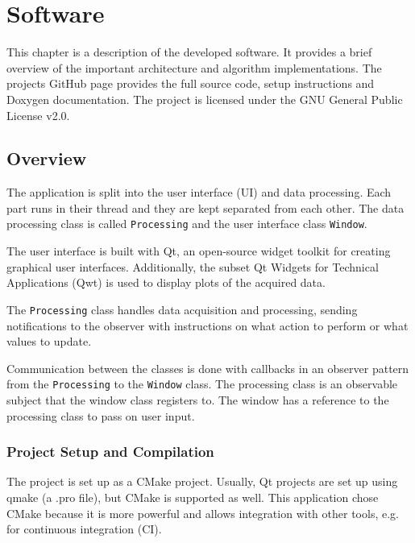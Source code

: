 \chapter{Software}\label{cp:sw}

This chapter is a description of the developed software. It provides a brief overview of the important architecture and algorithm implementations. The projects GitHub page provides the full source code, setup instructions and Doxygen documentation.\cite{Belinda2020} %
The project is licensed under the GNU General Public License v2.0.

\section{Overview}
The application is split into the user interface (UI) and data processing. Each part runs in their thread and they are kept separated from each other. The data processing class is called \texttt{Processing} and the user interface class \texttt{Window}. 

The user interface is built with Qt, an open-source widget toolkit for creating graphical user interfaces. Additionally, the subset Qt Widgets for Technical Applications (Qwt) is used to display plots of the acquired data.

The \texttt{Processing} class handles data acquisition and processing, sending notifications to the observer with instructions on what action to perform or what values to update.

Communication between the classes is done with callbacks in an observer pattern from the \texttt{Processing} to the \texttt{Window} class. The processing class is an observable subject that the window class registers to. The window has a reference to the processing class to pass on user input.


\subsection{Project Setup and Compilation}
The project is set up as a CMake project. Usually, Qt projects are set up using qmake (a .pro file), but CMake is supported as well. This application chose CMake because it is more powerful and allows integration with other tools, e.g. for continuous integration (CI). %

